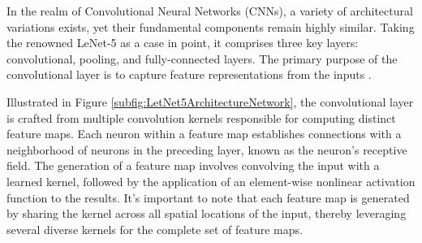 In the realm of Convolutional Neural Networks (CNNs), a variety of architectural variations exists, yet their fundamental components remain highly similar. Taking the renowned LeNet-5 as a case in point, it comprises three key layers: convolutional, pooling, and fully-connected layers. The primary purpose of the convolutional layer is to capture feature representations from the inputs \cite{Gu:2018}.

Illustrated in Figure \ref{subfig:LetNet5ArchitectureNetwork}, the convolutional layer is crafted from multiple convolution kernels responsible for computing distinct feature maps. Each neuron within a feature map establishes connections with a neighborhood of neurons in the preceding layer, known as the neuron's receptive field. The generation of a feature map involves convolving the input with a learned kernel, followed by the application of an element-wise nonlinear activation function to the results. It's important to note that each feature map is generated by sharing the kernel across all spatial locations of the input, thereby leveraging several diverse kernels for the complete set of feature maps.

